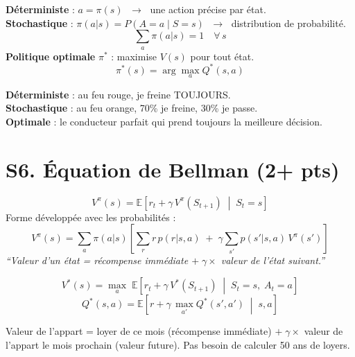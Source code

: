 \documentclass[11pt,a4paper]{article}
\newcommand{\E}{\mathbb{E}}
\begin{document}
\begin{formbox}
\textbf{Déterministe} : $a = \pi(s)$ $\;\to\;$ une action précise par état.\\[4pt]
\textbf{Stochastique} : $\pi(a|s) = P(A=a \mid S=s)$ $\;\to\;$ distribution de probabilité.
$$\sum_a \pi(a|s) = 1 \quad \forall\, s$$
\textbf{Politique optimale} $\pi^*$ : maximise $V(s)$ pour tout état.
$$\pi^*(s) = \arg\max_a Q^*(s, a)$$
\end{formbox}

\begin{exbox}
\textbf{Déterministe} : au feu rouge, je freine TOUJOURS.\\
\textbf{Stochastique} : au feu orange, 70\% je freine, 30\% je passe.\\
\textbf{Optimale} : le conducteur parfait qui prend toujours la meilleure décision.
\end{exbox}

\section{S6. Équation de Bellman (2+ pts)}

\begin{formbox}
$$\boxed{V^\pi(s) = \E\!\left[r_t + \gamma \, V^\pi(S_{t+1}) \;\middle|\; S_t = s\right]}$$
Forme développée avec les probabilités :
$$V^\pi(s) = \sum_{a} \pi(a|s) \left[\sum_{r} r \, p(r|s,a) \;+\; \gamma \sum_{s'} p(s'|s,a) \, V^\pi(s')\right]$$
\textit{``Valeur d'un état = récompense immédiate $+\; \gamma \times$ valeur de l'état suivant.''}
\end{formbox}

\begin{formbox}
$$\boxed{V^*(s) = \max_a \; \E\!\left[r_t + \gamma \, V^*(S_{t+1}) \;\middle|\; S_t = s,\; A_t = a\right]}$$
$$\boxed{Q^*(s, a) = \E\!\left[r + \gamma \, \max_{a'} Q^*(s', a') \;\middle|\; s, a\right]}$$
\end{formbox}

\begin{exbox}
Valeur de l'appart = loyer de ce mois (récompense immédiate) $+\; \gamma \times$ valeur de l'appart le mois prochain (valeur future). Pas besoin de calculer 50 ans de loyers.
\end{exbox}
\end{document}
